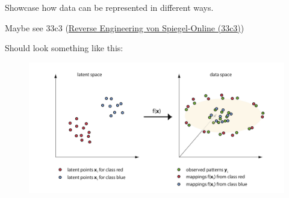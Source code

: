 
Showcase how data can be represented in different ways.

Maybe see 33c3 (\href{https://www.youtube.com/watch?v=-YpwsdRKt8Q}{Reverse Engineering von Spiegel-Online (33c3)})

Should look something like this:

\begin{figure}[h]
  \centering
  \includegraphics[width=0.9\linewidth]{external_content/graphs/latent_space_reduction_example.png}
  \captionsetup{justification=centering}
  \label{fig:visualisingReduction}
\end{figure}


